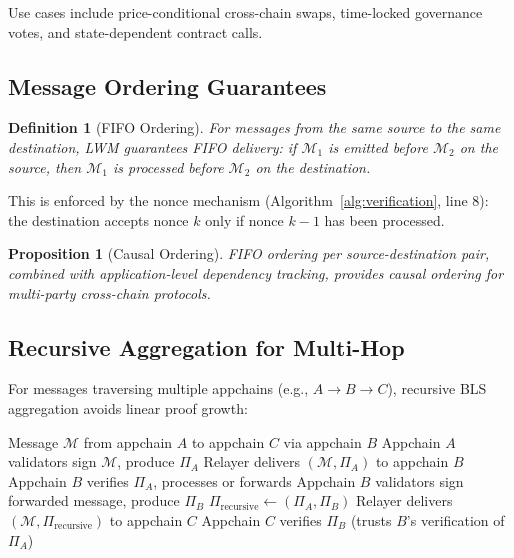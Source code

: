 \documentclass[11pt,a4paper]{article}
\newtheorem{proposition}[theorem]{Proposition}
\newtheorem{definition}{Definition}
\begin{document}
Use cases include price-conditional cross-chain swaps, time-locked governance votes, and state-dependent contract calls.

\subsection{Message Ordering Guarantees}

\begin{definition}[FIFO Ordering]
For messages from the same source to the same destination, LWM guarantees FIFO delivery: if $\mathcal{M}_1$ is emitted before $\mathcal{M}_2$ on the source, then $\mathcal{M}_1$ is processed before $\mathcal{M}_2$ on the destination.
\end{definition}

This is enforced by the nonce mechanism (Algorithm~\ref{alg:verification}, line 8): the destination accepts nonce $k$ only if nonce $k-1$ has been processed.

\begin{proposition}[Causal Ordering]
FIFO ordering per source-destination pair, combined with application-level dependency tracking, provides causal ordering for multi-party cross-chain protocols.
\end{proposition}

\subsection{Recursive Aggregation for Multi-Hop}

For messages traversing multiple appchains (e.g., $A \to B \to C$), recursive BLS aggregation avoids linear proof growth:

\begin{algorithm}[H]
\caption{Multi-Hop Warp Relay}
\label{alg:multihop}
\begin{algorithmic}[1]
\Require Message $\mathcal{M}$ from appchain $A$ to appchain $C$ via appchain $B$
\State Appchain $A$ validators sign $\mathcal{M}$, produce $\Pi_A$
\State Relayer delivers $(\mathcal{M}, \Pi_A)$ to appchain $B$
\State Appchain $B$ verifies $\Pi_A$, processes or forwards
\State Appchain $B$ validators sign forwarded message, produce $\Pi_B$
\State $\Pi_{\text{recursive}} \gets (\Pi_A, \Pi_B)$ 
\State Relayer delivers $(\mathcal{M}, \Pi_{\text{recursive}})$ to appchain $C$
\State Appchain $C$ verifies $\Pi_B$ (trusts $B$'s verification of $\Pi_A$)
\end{algorithmic}
\end{algorithm}
\end{document}

